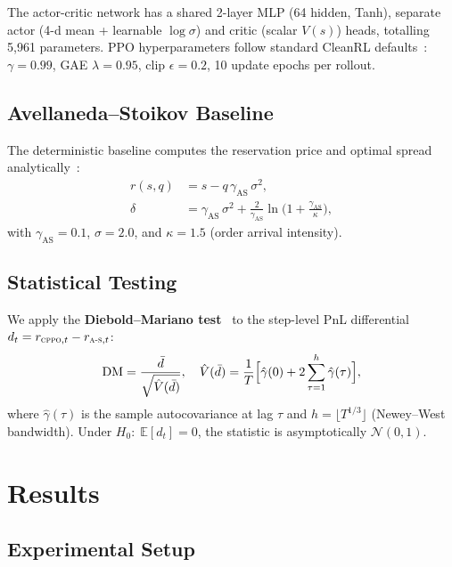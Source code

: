 \documentclass[11pt,twocolumn]{article}
\newcommand{\CPPO}{\textsc{cppo}}
\newcommand{\AS}{\textsc{a-s}}
\newcommand{\E}{\mathbb{E}}
\begin{document}
The actor-critic network has a shared 2-layer MLP
(64 hidden, Tanh), separate actor (4-d mean + learnable
$\log\sigma$) and critic (scalar $V(s)$) heads, totalling 5,961
parameters.  PPO hyperparameters follow standard CleanRL
defaults~\citep{huang2022cleanrl}: $\gamma{=}0.99$, GAE
$\lambda{=}0.95$, clip $\epsilon{=}0.2$, 10 update epochs per rollout.

\subsection{Avellaneda--Stoikov Baseline}\label{sec:as-baseline}

The deterministic baseline computes the reservation price and optimal
spread analytically~\citep{avellaneda2008hft}:
\begin{align}
  r(s, q) &= s - q\,\gamma_{\text{AS}}\,\sigma^2, \label{eq:as-res} \\
  \delta &= \gamma_{\text{AS}}\,\sigma^2
    + \tfrac{2}{\gamma_{\text{AS}}}
      \ln\!\bigl(1 + \tfrac{\gamma_{\text{AS}}}{\kappa}\bigr),
      \label{eq:as-spread}
\end{align}
with $\gamma_{\text{AS}}{=}0.1$, $\sigma{=}2.0$, and
$\kappa{=}1.5$ (order arrival intensity).

\subsection{Statistical Testing}\label{sec:dm}

We apply the \textbf{Diebold--Mariano test}~\citep{diebold1995comparing}
to the step-level PnL differential
$d_t = r_{\CPPO,t} - r_{\AS,t}$:
\begin{equation}\label{eq:dm}
  \text{DM} = \frac{\bar{d}}{\sqrt{\hat{V}(\bar{d})}},
  \quad
  \hat{V}(\bar{d}) = \frac{1}{T}\Bigl[
    \hat\gamma(0) + 2\sum_{\tau=1}^{h}\hat\gamma(\tau)
  \Bigr],
\end{equation}
where $\hat\gamma(\tau)$ is the sample autocovariance at lag $\tau$
and $h = \lfloor T^{1/3} \rfloor$ (Newey--West bandwidth).
Under $H_0{:}\;\E[d_t]{=}0$, the statistic is asymptotically
$\mathcal{N}(0,1)$.

\section{Results}\label{sec:results}

\subsection{Experimental Setup}
\end{document}
